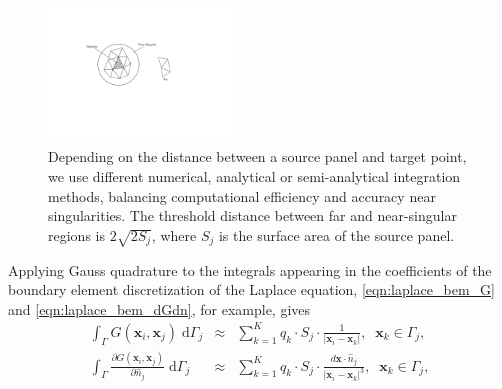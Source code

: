 \documentclass[final,3p,times]{elsarticle}
\newcommand{\di}[1]{\text{d}#1}
\newcommand{\partiald}[2]{\frac{\partial #1}{\partial #2}}
\newcommand{\nhat}{\hat{n}}
\newcommand{\vect}[1]{\mathbf{#1}}
\begin{document}
\begin{figure}[t]
	\begin{centering}
\includegraphics[natwidth=5.15in,natheight=2.6in,width=0.45\textwidth]{IntegrationDomain.pdf}
	\caption{Depending on the distance between a source panel and target point, we use different numerical, analytical or semi-analytical integration methods, balancing computational efficiency and accuracy near singularities. The threshold distance between far and near-singular regions is $2\sqrt{2 S_j}$, where $S_j$ is the surface area of the source panel.}
	\label{fig:integration_domain}
	\end{centering}
\end{figure}



Applying Gauss quadrature to the integrals appearing in the coefficients of the boundary element discretization of the Laplace equation, \eqref{eqn:laplace_bem_G} and \eqref{eqn:laplace_bem_dGdn}, for example, gives
%
\begin{eqnarray}
	\label{eqn:gauss:1st-kind}
	\int_{\Gamma} G(\vect{x}_i,\vect{x}_j)\;\di{\Gamma_j} & \approx & \sum_{k=1}^{K} q_k\cdot S_j\cdot \frac{1}{|\vect{x}_i-\vect{x}_k|},\;\;\vect{x}_k \in \Gamma_j, \\ 
	\label{eqn:gauss:2nd-kind}
	\int_{\Gamma} \partiald{G(\vect{x}_i,\vect{x}_j)}{\nhat_j}\;\di{\Gamma_j} & \approx & \sum_{k=1}^{K}q_k\cdot S_j\cdot \frac{d\vect{x}\cdot\nhat_j}{|\vect{x}_i-\vect{x}_k|^{3}},\;\;\vect{x}_k \in \Gamma_j,
\end{eqnarray}
\end{document}
